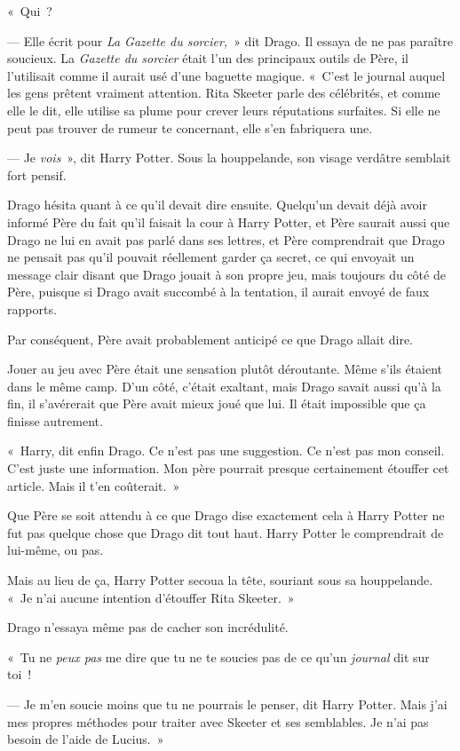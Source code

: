 «~Qui~?

--- Elle écrit pour \emph{La Gazette du sorcier,}~» dit Drago. Il essaya de ne pas paraître soucieux. La \emph{Gazette du sorcier} était l'un des principaux outils de Père, il l'utilisait comme il aurait usé d'une baguette magique. «~C'est le journal auquel les gens prêtent vraiment attention. Rita Skeeter parle des célébrités, et comme elle le dit, elle utilise sa plume pour crever leurs réputations surfaites. Si elle ne peut pas trouver de rumeur te concernant, elle s'en fabriquera une.

--- Je \emph{vois}~», dit Harry Potter. Sous la houppelande, son visage verdâtre semblait fort pensif.

Drago hésita quant à ce qu'il devait dire ensuite. Quelqu'un devait déjà avoir informé Père du fait qu'il faisait la cour à Harry Potter, et Père saurait aussi que Drago ne lui en avait pas parlé dans ses lettres, et Père comprendrait que Drago ne pensait pas qu'il pouvait réellement garder ça secret, ce qui envoyait un message clair disant que Drago jouait à son propre jeu, mais toujours du côté de Père, puisque si Drago avait succombé à la tentation, il aurait envoyé de faux rapports.

Par conséquent, Père avait probablement anticipé ce que Drago allait dire.

Jouer au jeu avec Père était une sensation plutôt déroutante. Même s'ils étaient dans le même camp. D'un côté, c'était exaltant, mais Drago savait aussi qu'à la fin, il s'avérerait que Père avait mieux joué que lui. Il était impossible que ça finisse autrement.

«~Harry, dit enfin Drago. Ce n'est pas une suggestion. Ce n'est pas mon conseil. C'est juste une information. Mon père pourrait presque certainement étouffer cet article. Mais il t'en coûterait.~»

Que Père se soit attendu à ce que Drago dise exactement cela à Harry Potter ne fut pas quelque chose que Drago dit tout haut. Harry Potter le comprendrait de lui-même, ou pas.

Mais au lieu de ça, Harry Potter secoua la tête, souriant sous sa houppelande. «~Je n'ai aucune intention d'étouffer Rita Skeeter.~»

Drago n'essaya même pas de cacher son incrédulité.

«~Tu ne \emph{peux pas} me dire que tu ne te soucies pas de ce qu'un \emph{journal} dit sur toi~!

--- Je m'en soucie moins que tu ne pourrais le penser, dit Harry Potter. Mais j'ai mes propres méthodes pour traiter avec Skeeter et ses semblables. Je n'ai pas besoin de l'aide de Lucius.~»

